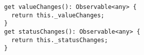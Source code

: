 \begin{verbatim}
  get valueChanges(): Observable<any> {
    return this._valueChanges;
  }
  get statusChanges(): Observable<any> {
    return this._statusChanges;
  }
\end{verbatim}
